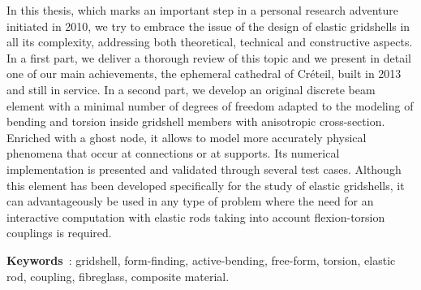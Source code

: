 {In this thesis, which marks an important step in a personal research adventure initiated in 2010, we try to embrace the issue of the design of elastic gridshells in all its complexity, addressing both theoretical, technical and constructive aspects. In a first part, we deliver a thorough review of this topic and we present in detail one of our main achievements, the ephemeral cathedral of Créteil, built in 2013 and still in service. In a second part, we develop an original discrete beam element with a minimal number of degrees of freedom adapted to the modeling of bending and torsion inside gridshell members with anisotropic cross-section. Enriched with a ghost node, it allows to model more accurately physical phenomena that occur at connections or at supports. Its numerical implementation is presented and validated through several test cases. Although this element has been developed specifically for the study of elastic gridshells, it can advantageously be used in any type of problem where the need for an interactive computation with elastic rods taking into account flexion-torsion couplings is required.

\textbf{Keywords}~: gridshell, form-finding, active-bending, free-form, torsion, elastic rod, coupling, fibreglass, composite material.
}

